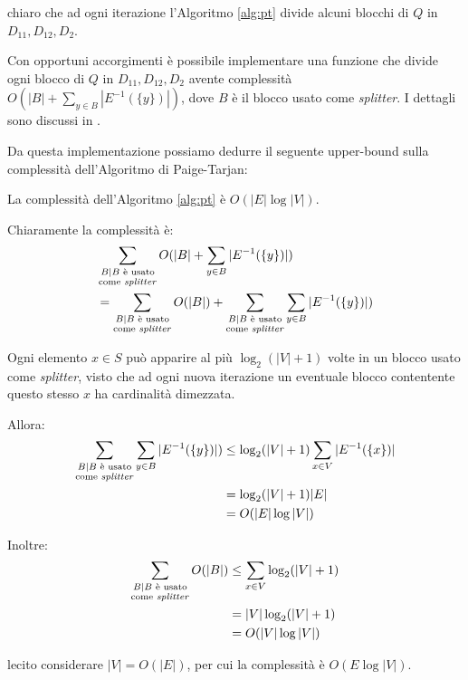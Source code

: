 \accente chiaro che ad ogni iterazione l'Algoritmo \ref{alg:pt} divide alcuni blocchi di $Q$ in $D_{11}, D_{12}, D_2$.

\begin{observation}
    Con opportuni accorgimenti è possibile implementare una funzione che divide ogni blocco di $Q$ in $D_{11}, D_{12}, D_2$ avente complessità $O(|B| + \sum_{y \in B} |E^{-1}(\{y\})|)$, dove $B$ è il blocco usato come \emph{splitter}. I dettagli sono discussi in \cite{paigetarjan}.
\end{observation}

Da questa implementazione possiamo dedurre il seguente upper-bound sulla complessità dell'Algoritmo di Paige-Tarjan:

\begin{theorem}
    La complessità dell'Algoritmo \ref{alg:pt} è $O(|E|\log |V|)$.
\end{theorem}
\begin{proof2}
    Chiaramente la complessità è:
    \begin{align*}
        \displaystyle &\sum_{\substack{B \mid B \text{ è usato}\\\text{come \emph{splitter}}}} O(|B| + \sum_{y \in B} |E^{-1}(\{y\})|)\\
        &= \sum_{\substack{B \mid B \text{ è usato}\\\text{come \emph{splitter}}}} O(|B|) + \sum_{\substack{B \mid B \text{ è usato}\\\text{come \emph{splitter}}}} \sum_{y \in B} |E^{-1}(\{y\})|)
    \end{align*}

    \begin{observation}
        Ogni elemento $x \in S$ può apparire al più $\log_2 (|V| + 1)$ volte in un blocco usato come \emph{splitter}, visto che ad ogni nuova iterazione un eventuale blocco contentente questo stesso $x$ ha cardinalità dimezzata.
    \end{observation}

    Allora:
    \begin{align*}
        \sum_{\substack{B \mid B \text{ è usato}\\\text{come \emph{splitter}}}} \sum_{y \in B} |E^{-1}(\{y\})|) &\leq \log_2 (|V|+1) \sum_{x \in V} |E^{-1}(\{x\})|\\
        &= \log_2 (|V|+1) |E|\\
        &= O(|E|\log |V|)
    \end{align*}

    Inoltre:
    \begin{align*}
        \sum_{\substack{B \mid B \text{ è usato}\\\text{come \emph{splitter}}}} O(|B|) &\leq \sum_{x \in V} \log_{2} (|V|+1)\\
        &= |V|\log_{2} (|V|+1)\\
        &= O(|V|\log |V|)
    \end{align*}

    \accente lecito considerare $|V| = O(|E|)$, per cui la complessità è $O(E\log |V|)$.
\end{proof2}

